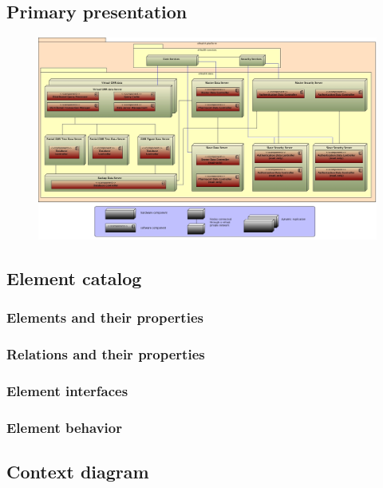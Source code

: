 \documentclass[a4paper,10pt]{book}
\begin{document}
\subsection{Primary presentation}
\begin{center}
    \begin{figure}
      \includegraphics[width=\textwidth]{../images/deployment_data.jpg}
    \end{figure}
  \end{center}

\subsection{Element catalog}

\subsubsection{Elements and their properties}

\subsubsection{Relations and their properties}

\subsubsection{Element interfaces}

\subsubsection{Element behavior}

\subsection{Context diagram}
\end{document}
